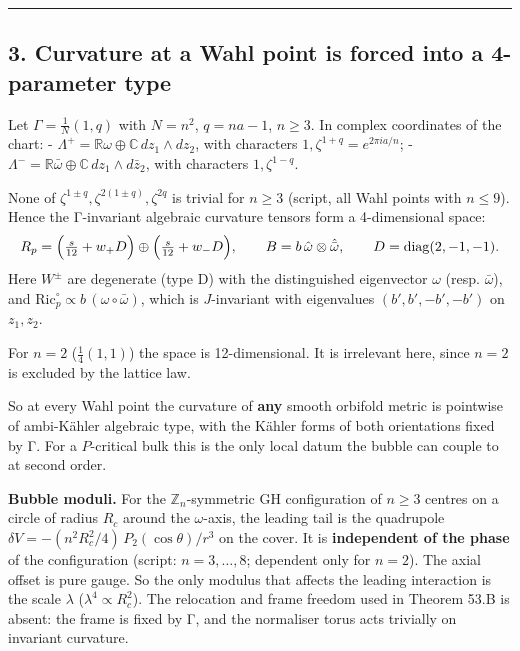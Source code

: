 \documentclass[
  10pt,
]{report}
\begin{document}
\begin{center}\rule{0.5\linewidth}{0.5pt}\end{center}

\hypertarget{curvature-at-a-wahl-point-is-forced-into-a-4-parameter-type}{%
\subsection{3. Curvature at a Wahl point is forced into a 4-parameter
type}\label{curvature-at-a-wahl-point-is-forced-into-a-4-parameter-type}}

Let \(\Gamma=\tfrac1{N}(1,q)\) with \(N=n^2\), \(q=na-1\), \(n\ge3\). In
complex coordinates of the chart: -
\(\Lambda^+=\mathbb R\omega\oplus\mathbb C\,dz_1\wedge dz_2\), with
characters \(1,\zeta^{1+q}=e^{2\pi ia/n}\); -
\(\Lambda^-=\mathbb R\bar\omega\oplus\mathbb C\,dz_1\wedge d\bar z_2\),
with characters \(1,\zeta^{1-q}\).

None of \(\zeta^{1\pm q},\zeta^{2(1\pm q)},\zeta^{2q}\) is trivial for
\(n\ge3\) (script, all Wahl points with \(n\le9\)). Hence the
Γ-invariant algebraic curvature tensors form a 4-dimensional space: \[
R_p=\Bigl(\tfrac{s}{12}+w_+D\Bigr)\oplus\Bigl(\tfrac{s}{12}+w_-D\Bigr),\qquad B=b\,\hat\omega\otimes\hat{\bar\omega},
\qquad D=\operatorname{diag}(2,-1,-1).
\] Here \(W^\pm\) are degenerate (type D) with the distinguished
eigenvector \(\omega\) (resp. \(\bar\omega\)), and
\(\mathrm{Ric}^\circ_p\propto b\,(\omega\circ\bar\omega)\), which is
\(J\)-invariant with eigenvalues \((b',b',-b',-b')\) on \(z_1,z_2\).

For \(n=2\) (\(\tfrac14(1,1)\)) the space is 12-dimensional. It is
irrelevant here, since \(n=2\) is excluded by the lattice law.

So at every Wahl point the curvature of \textbf{any} smooth orbifold
metric is pointwise of ambi-Kähler algebraic type, with the Kähler forms
of both orientations fixed by Γ. For a \(P\)-critical bulk this is the
only local datum the bubble can couple to at second order.

\textbf{Bubble moduli.} For the \(\mathbb Z_n\)-symmetric GH
configuration of \(n\ge3\) centres on a circle of radius \(R_c\) around
the \(\omega\)-axis, the leading tail is the quadrupole
\(\delta V=-(n^2R_c^2/4)\,P_2(\cos\theta)/r^3\) on the cover. It is
\textbf{independent of the phase} of the configuration (script:
\(n=3,\dots,8\); dependent only for \(n=2\)). The axial offset is pure
gauge. So the only modulus that affects the leading interaction is the
scale \(\lambda\) (\(\lambda^4\propto R_c^2\)). The relocation and frame
freedom used in Theorem 53.B is absent: the frame is fixed by Γ, and the
normaliser torus acts trivially on invariant curvature.
\end{document}
